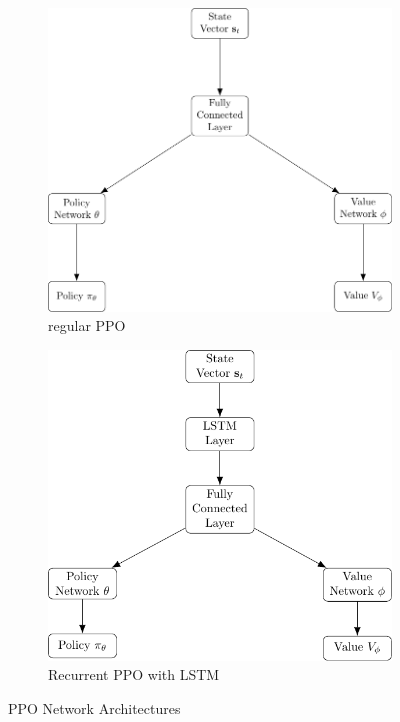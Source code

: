 \begin{figure}[ht!]
    \centering
    \begin{subfigure}{0.45\textwidth}
        \includegraphics[width=\textwidth]{./futureWork/tikz/ppo_diagram.pdf}
        \caption{regular PPO}
        \label{subfig3:architecturePPO}
    \end{subfigure}
    \hspace{1cm}
    \begin{subfigure}{0.45\textwidth}
        \includegraphics[width=\textwidth]{./futureWork/tikz/recurrentppo_diagram.pdf}
        \caption{Recurrent PPO with LSTM}
        \label{subfig3:architectureLSTMPPO}
    \end{subfigure}
    \caption{PPO Network Architectures} 
    \label{fig3:architecturePPO}
\end{figure}

